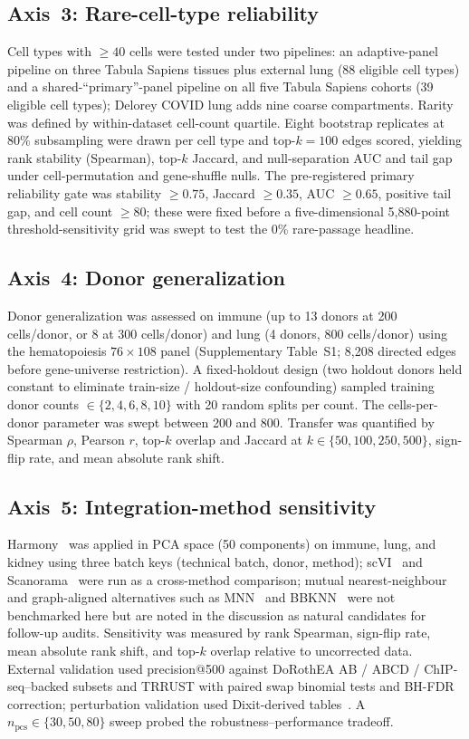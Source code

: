 \documentclass[unnumsec,webpdf,contemporary,large,namedate]{oup-authoring-template}
\begin{document}
\subsection{Axis~3: Rare-cell-type reliability}

Cell types with $\geq 40$ cells were tested under two pipelines: an
adaptive-panel pipeline on three Tabula Sapiens tissues plus external
lung (88 eligible cell types) and a shared-``primary''-panel pipeline
on all five Tabula Sapiens cohorts (39 eligible cell types); Delorey
COVID lung adds nine coarse compartments. Rarity was defined by
within-dataset cell-count quartile. Eight bootstrap replicates at 80\%
subsampling were drawn per cell type and top-$k = 100$ edges scored,
yielding rank stability (Spearman), top-$k$ Jaccard, and
null-separation AUC and tail gap under cell-permutation and
gene-shuffle nulls. The pre-registered primary reliability gate was
stability $\geq 0.75$, Jaccard $\geq 0.35$, AUC $\geq 0.65$, positive
tail gap, and cell count $\geq 80$; these were fixed before a
five-dimensional 5{,}880-point threshold-sensitivity grid was swept
to test the 0\% rare-passage headline.

\subsection{Axis~4: Donor generalization}

Donor generalization was assessed on immune (up to 13 donors at 200
cells/donor, or 8 at 300 cells/donor) and lung (4 donors, 800
cells/donor) using the hematopoiesis $76 \times 108$ panel
(Supplementary Table~S1; 8{,}208 directed edges before gene-universe
restriction). A fixed-holdout design (two holdout donors held constant
to eliminate train-size / holdout-size confounding) sampled training
donor counts $\in \{2, 4, 6, 8, 10\}$ with 20 random splits per count.
The cells-per-donor parameter was swept between 200 and 800. Transfer
was quantified by Spearman $\rho$, Pearson $r$, top-$k$ overlap and
Jaccard at $k \in \{50, 100, 250, 500\}$, sign-flip rate, and mean
absolute rank shift.

\subsection{Axis~5: Integration-method sensitivity}

Harmony~\citep{Korsunsky2019} was applied in PCA space (50 components)
on immune, lung, and kidney using three batch keys (technical batch,
donor, method); scVI~\citep{Gayoso2022} and Scanorama~\citep{Hie2019}
were run as a cross-method comparison; mutual nearest-neighbour and
graph-aligned alternatives such as MNN~\citep{Haghverdi2018} and
BBKNN~\citep{Polanski2020} were not benchmarked here but are noted in
the discussion as natural candidates for follow-up audits. Sensitivity was measured by
rank Spearman, sign-flip rate, mean absolute rank shift, and top-$k$
overlap relative to uncorrected data. External validation used
precision@500 against DoRothEA AB / ABCD / ChIP-seq--backed subsets
and TRRUST with paired swap binomial tests and BH-FDR correction;
perturbation validation used Dixit-derived
tables~\citep{Dixit2016}. A $n_{\text{pcs}} \in \{30, 50, 80\}$ sweep
probed the robustness--performance tradeoff.
\end{document}
